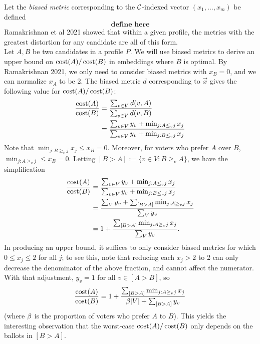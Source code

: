 \documentclass{amsart}
\DeclareMathOperator{\cost}{\rm{cost}}
\begin{document}
Let the \textit{biased metric} corresponding to the $\mathcal{C}$-indexed vector $(x_1,\dots,x_m)$ be defined 
$$\textbf{define here}$$
Ramakrishnan et al 2021 showed that within a given profile, the metrics with the greatest distortion for any candidate are all of this form.\\

Let $A,B$ be two candidates in a profile $P$. We will use biased metrics to derive an upper bound on $\cost(A)/\cost(B)$ in embeddings where $B$ is optimal. By Ramakrishnan 2021, we only need to consider biased metrics with $x_B=0$, and we can normalize $x_A$ to be 2. The biased metric $d$ corresponding to $\vec{x}$ gives the following value for $\cost(A)/\cost(B)$:
\begin{align*}
\frac{\cost(A)}{\cost(B)} &= \frac{\sum_{v\in V} d(v,A)}{\sum_{v\in V} d(v,B)}\\
&= \frac{\sum_{v\in V} y_v + \min_{j:A\leq_v j} x_j}{\sum_{v\in V} y_v + \min_{j:B\leq_v j} x_j}
\end{align*}
Note that $\min_{j:B\geq_v j}x_j \leq x_B = 0$. Moreover, for voters who prefer $A$ over $B$, $\min_{j:A\geq_v j} \leq x_B = 0$. Letting $[B>A] := \{v\in V: B\geq_v A\}$, we have the simplification
\begin{align*}
	\frac{\cost(A)}{\cost(B)}
	&= \frac{\sum_{v\in V} y_v + \min_{j:A\leq_v j} x_j}{\sum_{v\in V} y_v + \min_{j:B\leq_v j} x_j}\\
	&= \frac{\sum_V y_v + \sum_{[B>A]} \min_{j:A\geq_v j} x_j}{\sum_V y_v}\\
	&= 1 + \frac{\sum_{[B>A]}\min_{j:A\geq_v j}x_j}{\sum_V y_v}.
\end{align*}
In producing an upper bound, it suffices to only consider biased metrics for which $0\leq x_j \leq 2$ for all $j$; to see this, note that reducing each $x_j>2$ to 2 can only decrease the denominator of the above fraction, and cannot affect the numerator. With that adjustment, $y_v=1$ for all $v\in [A>B]$, so
$$
\frac{\cost(A)}{\cost(B)} = 1 + \frac{\sum_{[B>A]} \min_{j:A\geq_v j} x_j}{ \b |V| + \sum_{[B>A]} y_v}
$$
(where $\beta$ is the proportion of voters who prefer $A$ to $B$). This yields the interesting observation that the worst-case $\cost(A)/\cost(B)$ only depends on the ballots in $[B>A]$.\\
\end{document}
